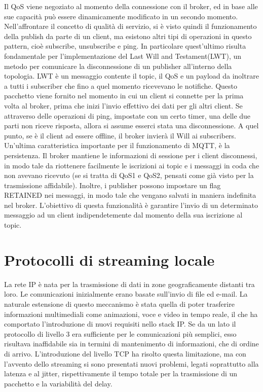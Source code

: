 Il QoS viene negoziato al momento della connessione con il broker, ed in base alle sue capacità può essere dinamicamente modificato in un secondo momento. Nell'affrontare il concetto di qualità di servizio, si è visto quindi il funzionamento della publish da parte di un client, ma esistono altri tipi di operazioni in questo pattern, cioè subscribe, unsubscribe e ping. In particolare quest'ultimo risulta fondamentale per l'implementazione del Last Will and Testament(LWT), un metodo per comunicare la disconnessione di un publisher all'interno della topologia. LWT è un messaggio contente il topic, il QoS e un payload da inoltrare a tutti i subscriber che fino a quel momento ricevevano le notifiche. Questo pacchetto viene fornito nel momento in cui un client si connette per la prima volta al broker, prima che inizi l'invio effettivo dei dati per gli altri client. Se attraverso delle operazioni di ping, impostate con un certo timer, una delle due parti non riceve risposta, allora si assume esserci stata una disconnessione. A quel punto, se è il client ad essere offline, il broker invierà il Will ai subscribers. Un'ultima caratteristica importante per il funzionamento di MQTT, è la persistenza. Il broker mantiene le informazioni di sessione per i client disconnessi, in modo tale da riottenere facilmente le iscrizioni ai topic e i messaggi in coda che non avevano ricevuto (se si tratta di QoS1 e QoS2, pensati come già visto per la trasmissione affidabile). Inoltre, i publisher possono impostare un flag RETAINED nei messaggi, in modo tale che vengano salvati in maniera indefinita nel broker. L'obiettivo di questa funzionalità è garantire l'invio di un determinato messaggio ad un client indipendetemente dal momento della sua iscrizione al topic.  

\section{Protocolli di streaming locale}
La rete IP è nata per la trasmissione di dati in zone geograficamente distanti tra loro. Le comunicazioni inizialmente erano basate sull'invio di file ed e-mail. La naturale estensione di questo meccanismo è stata quella di poter trasferire informazioni multimediali come animazioni, voce e video in tempo reale, il che ha comportato l'introduzione di nuovi requisiti nello stack IP. Se da un lato il protocollo di livello 3 era sufficiente per le comunicazioni più semplici, esso risultava inaffidabile sia in termini di mantenimento di informazioni, che di ordine di arrivo. L'introduzione del livello TCP ha risolto questa limitazione, ma con l'avvento dello streaming si sono presentati nuovi problemi, legati soprattutto alla latenza e al jitter, rispettivamente il tempo totale per la trasmissione di un pacchetto e la variabilità del delay. 

